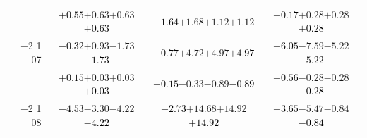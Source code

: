 \documentclass[compress]{beamer}
\begin{document}
\begin{frame}
\begin{tabular}{r | c | c | c}
          & \textcolor{black}{$+0.55$}\hspace{0.1 cm}$+0.63$\hspace{0.1 cm}$+0.63$\hspace{0.1 cm}\textcolor{black}{$+0.63$} & \textcolor{black}{$+1.64$}\hspace{0.1 cm}$+1.68$\hspace{0.1 cm}$+1.12$\hspace{0.1 cm}\textcolor{black}{$+1.12$} & \textcolor{black}{$+0.17$}\hspace{0.1 cm}$+0.28$\hspace{0.1 cm}$+0.28$\hspace{0.1 cm}\textcolor{black}{$+0.28$} \\
$-$2 1 07 & \textcolor{black}{$-0.32$}\hspace{0.1 cm}$+0.93$\hspace{0.1 cm}$-1.73$\hspace{0.1 cm}\textcolor{black}{$-1.73$} & \textcolor{black}{$-0.77$}\hspace{0.1 cm}$+4.72$\hspace{0.1 cm}$+4.97$\hspace{0.1 cm}\textcolor{black}{$+4.97$} & \textcolor{black}{$-6.05$}\hspace{0.1 cm}$-7.59$\hspace{0.1 cm}$-5.22$\hspace{0.1 cm}\textcolor{black}{$-5.22$} \\
          & \textcolor{black}{$+0.15$}\hspace{0.1 cm}$+0.03$\hspace{0.1 cm}$+0.03$\hspace{0.1 cm}\textcolor{black}{$+0.03$} & \textcolor{black}{$-0.15$}\hspace{0.1 cm}$-0.33$\hspace{0.1 cm}$-0.89$\hspace{0.1 cm}\textcolor{black}{$-0.89$} & \textcolor{black}{$-0.56$}\hspace{0.1 cm}$-0.28$\hspace{0.1 cm}$-0.28$\hspace{0.1 cm}\textcolor{black}{$-0.28$} \\
$-$2 1 08 & \textcolor{black}{$-4.53$}\hspace{0.1 cm}$-3.30$\hspace{0.1 cm}$-4.22$\hspace{0.1 cm}\textcolor{black}{$-4.22$} & \textcolor{black}{$-2.73$}\hspace{0.1 cm}$+14.68$\hspace{0.1 cm}$+14.92$\hspace{0.1 cm}\textcolor{black}{$+14.92$} & \textcolor{black}{$-3.65$}\hspace{0.1 cm}$-5.47$\hspace{0.1 cm}$-0.84$\hspace{0.1 cm}\textcolor{black}{$-0.84$} \\

\end{tabular}
\end{frame}
\end{document}
